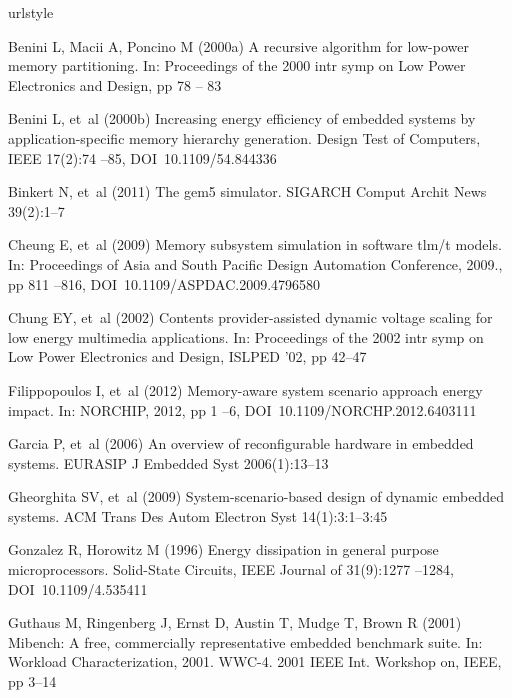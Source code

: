 \documentclass[smallcondensed]{svjour3}
\begin{document}
%
%
\begin{thebibliography}{40}
\providecommand{\natexlab}[1]{#1}
\providecommand{\url}[1]{{#1}}
\providecommand{\urlprefix}{URL }
\expandafter\ifx\csname urlstyle\endcsname\relax
  \providecommand{\doi}[1]{DOI~\discretionary{}{}{}#1}\else
  \providecommand{\doi}{DOI~\discretionary{}{}{}\begingroup
  \urlstyle{rm}\Url}\fi
\providecommand{\eprint}[2][]{\url{#2}}

Benini L, Macii A, Poncino M (2000{\natexlab{a}}) A recursive algorithm for
  low-power memory partitioning. In: Proceedings of the 2000 intr symp on Low
  Power Electronics and Design, pp 78 -- 83

Benini L, et~al (2000{\natexlab{b}}) Increasing energy efficiency of embedded
  systems by application-specific memory hierarchy generation. Design Test of
  Computers, IEEE 17(2):74 --85, \doi{10.1109/54.844336}

Binkert N, et~al (2011) The gem5 simulator. SIGARCH Comput Archit News
  39(2):1--7

Cheung E, et~al (2009) Memory subsystem simulation in software tlm/t models.
  In: Proceedings of Asia and South Pacific Design Automation Conference,
  2009., pp 811 --816, \doi{10.1109/ASPDAC.2009.4796580}

Chung EY, et~al (2002) Contents provider-assisted dynamic voltage scaling for
  low energy multimedia applications. In: Proceedings of the 2002 intr symp on
  Low Power Electronics and Design, ISLPED '02, pp 42--47

Filippopoulos I, et~al (2012) Memory-aware system scenario approach energy
  impact. In: NORCHIP, 2012, pp 1 --6, \doi{10.1109/NORCHP.2012.6403111}

Garcia P, et~al (2006) An overview of reconfigurable hardware in embedded
  systems. EURASIP J Embedded Syst 2006(1):13--13

Gheorghita SV, et~al (2009) System-scenario-based design of dynamic embedded
  systems. ACM Trans Des Autom Electron Syst 14(1):3:1--3:45

Gonzalez R, Horowitz M (1996) Energy dissipation in general purpose
  microprocessors. Solid-State Circuits, IEEE Journal of 31(9):1277 --1284,
  \doi{10.1109/4.535411}

Guthaus M, Ringenberg J, Ernst D, Austin T, Mudge T, Brown R (2001) Mibench: A
  free, commercially representative embedded benchmark suite. In: Workload
  Characterization, 2001. WWC-4. 2001 IEEE Int. Workshop on, IEEE, pp 3--14


\end{thebibliography}
\end{document}
